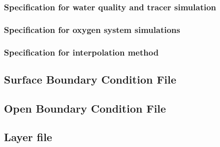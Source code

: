 \subsubsection{Specification for water quality and tracer simulation}

\subsubsection{Specification for oxygen system simulations}

\subsubsection{Specification for interpolation method}


\subsection{Surface Boundary Condition File}
\label{S:surfbc}


\subsection{Open Boundary Condition File}
\label{S:openbc}

\subsection{Layer file}
\label{S:layer}